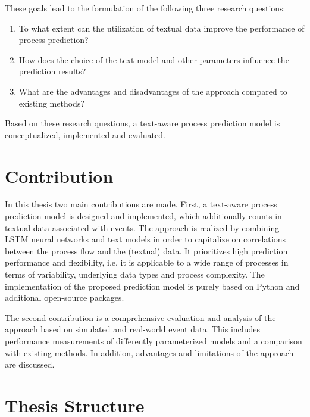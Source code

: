 These goals lead to the formulation of the following three research questions:

\begin{enumerate}
	\item To what extent can the utilization of textual data improve the performance of process prediction?
	\item How does the choice of the text model and other parameters influence the prediction results?
	\item What are the advantages and disadvantages of the approach compared to existing methods?
\end{enumerate}

Based on these research questions, a text-aware process prediction model is conceptualized, implemented and evaluated.

\section{Contribution}

In this thesis two main contributions are made.
First, a text-aware process prediction model is designed and implemented, which additionally counts in textual data associated with events.
The approach is realized by combining LSTM neural networks and text models in order to capitalize on correlations between the process flow and the (textual) data.
It prioritizes high prediction performance and flexibility, i.e. it is applicable to a wide range of processes in terms of variability, underlying data types and process complexity.
The implementation of the proposed prediction model is purely based on Python and additional open-source packages.

The second contribution is a comprehensive evaluation and analysis of the approach based on simulated and real-world event data.
This includes performance measurements of differently parameterized models and a comparison with existing methods.
In addition, advantages and limitations of the approach are discussed.

\section{Thesis Structure}

